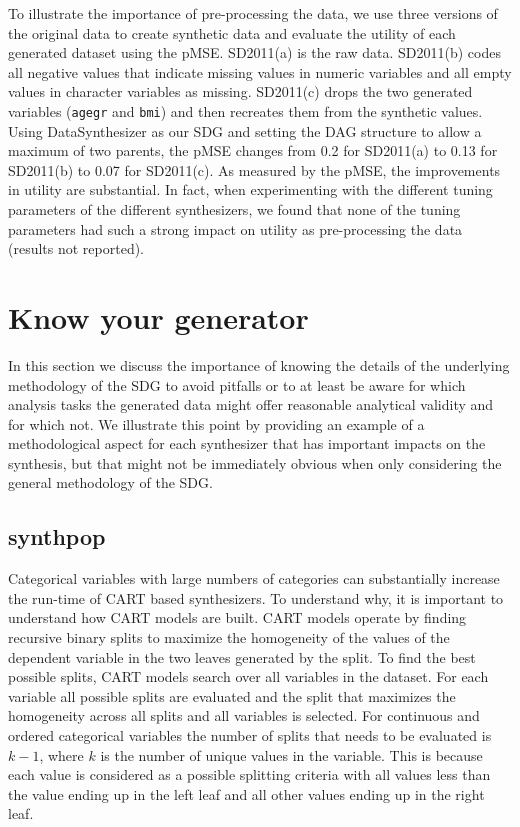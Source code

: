 \documentclass[runningheads]{llncs}
\begin{document}
To illustrate the importance of pre-processing the data, we use three versions of the original data to create synthetic data and evaluate the utility of each generated dataset using the pMSE.  SD2011(a) is the raw data.  SD2011(b) codes all negative values that indicate missing values in numeric variables and all empty values in character variables as missing.  SD2011(c) drops the two generated variables (\texttt{agegr} and \texttt{bmi}) and then recreates them from the synthetic values. Using DataSynthesizer as our SDG and setting the DAG structure to allow a maximum of two parents, the pMSE changes from 0.2 for SD2011(a) to 0.13 for SD2011(b) to 0.07 for SD2011(c). As measured by the pMSE, the improvements in utility are substantial. In fact, when experimenting with the different tuning parameters of the different synthesizers, we found that none of the tuning parameters had such a strong impact on utility as pre-processing the data (results not reported).   

\section{Know your generator}\label{sec:know_your_generator}

In this section we discuss the importance of knowing the details of the underlying methodology of the SDG to avoid pitfalls or to at least be aware for which analysis tasks the generated data might offer reasonable analytical validity and for which not. We illustrate this point by providing an example of a methodological aspect for each synthesizer that has important impacts on the synthesis, but that might not be immediately obvious when only considering the general methodology of the SDG.  

\subsection{synthpop} 

Categorical variables with large numbers of categories can substantially increase the run-time of CART based synthesizers. To understand why, it is important to understand how CART models are built. CART models operate by finding recursive binary splits to maximize the homogeneity of the values of the dependent variable in the two leaves generated by the split. To find the best possible splits, CART models search over all variables in the dataset. For each variable all possible splits are evaluated and the split that maximizes the homogeneity across all splits and all variables is selected. For continuous and ordered categorical variables the number of splits that needs to be evaluated is $k-1$, where $k$ is the number of unique values in the variable. This is because each value is considered as a possible splitting criteria with all values less than the value ending up in the left leaf and all other values ending up in the right leaf. 
\end{document}
